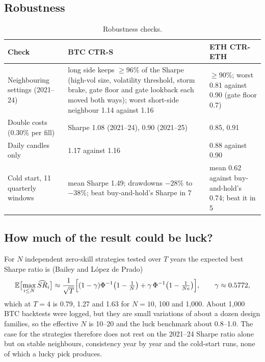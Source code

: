 \documentclass[11pt,a4paper]{article}
\theoremstyle{definition}
\begin{document}
\subsection{Robustness}
\begin{table}[htbp]\centering\small
\begin{tabularx}{\linewidth}{@{}p{32mm}L L@{}}
\toprule
\textbf{Check} & \textbf{BTC CTR-S} & \textbf{ETH CTR-ETH}\\
\midrule
Neighbouring settings (2021--24) & long side keeps $\ge96\%$ of the Sharpe (high-vol size, volatility threshold, storm brake, gate floor and gate lookback each moved both ways); worst short-side neighbour 1.14 against 1.16 & $\ge90\%$; worst 0.81 against 0.90 (gate floor 0.7)\\
Double costs (0.30\% per fill) & Sharpe 1.08 (2021--24), 0.90 (2021--25) & 0.85, 0.91\\
Daily candles only & 1.17 against 1.16 & 0.88 against 0.90\\
Cold start, 11 quarterly windows & mean Sharpe 1.49; drawdowns $-28\%$ to $-38\%$; beat buy-and-hold's Sharpe in 7 & mean 0.62 against buy-and-hold's 0.74; beat it in 5\\
\bottomrule
\end{tabularx}
\caption{Robustness checks.}
\end{table}

\subsection{How much of the result could be luck?}\label{sec:luck}
For $N$ independent zero-skill strategies tested over $T$ years the expected best Sharpe ratio is (Bailey and L\'opez de Prado)
\begin{equation}
\mathbb E\bigl[\max_{i\le N}\widehat{SR}_i\bigr]\approx\frac{1}{\sqrt T}\Bigl[(1-\gamma)\Phi^{-1}\bigl(1-\tfrac1N\bigr)+\gamma\,\Phi^{-1}\bigl(1-\tfrac{1}{Ne}\bigr)\Bigr],\qquad\gamma\approx0.5772,
\end{equation}
which at $T=4$ is 0.79, 1.27 and 1.63 for $N=10$, 100 and 1{,}000. About 1{,}000 BTC backtests were logged, but they are small variations of about a dozen design families, so the effective $N$ is 10--20 and the luck benchmark about 0.8--1.0. The case for the strategies therefore does not rest on the 2021--24 Sharpe ratio alone but on stable neighbours, consistency year by year and the cold-start runs, none of which a lucky pick produces.

\end{document}

